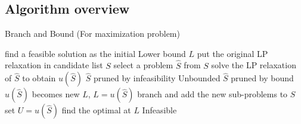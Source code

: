         \subsection{Algorithm overview}
            \begin{algorithm}[H]
                \caption{Branch and Bound (For maximization problem)}
                \begin{algorithmic}[1]
                    \State find a feasible solution as the initial Lower bound $L$
                    \State put the original LP relaxation in candidate list $S$
                        \State select a problem $\hat{S}$ from $S$
                        \State solve the LP relaxation of $\hat{S}$ to obtain $u(\hat{S})$
                            \State $\hat{S}$ pruned by infeasibility
                            \State \Return Unbounded
                            \State $\hat{S}$ pruned by bound
                                \State $u(\hat{S})$ becomes new $L$, $L=u(\hat{S})$
                                \State branch and add the new sub-problems to $S$
                                    \State set $U=u(\hat{S})$
                                \EndIf
                            \EndIf
                        \EndIf
                    \EndWhile
                        \State find the optimal at $L$
                    \Else
                        \State Infeasible
                    \EndIf
                \end{algorithmic}
            \end{algorithm}

